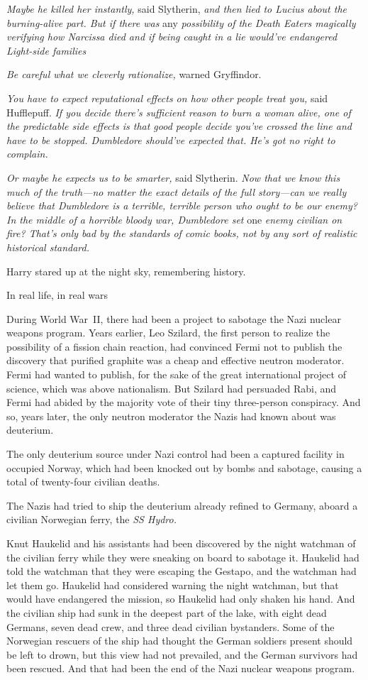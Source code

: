 \emph{Maybe he killed her instantly,} said Slytherin, \emph{and then lied to
Lucius about the burning-alive part. But{\el} if there was} any
\emph{possibility of the Death Eaters magically verifying how Narcissa
died{\el} and if being caught in a lie would've endangered Light-side
families{\el}}

\emph{Be careful what we cleverly rationalize,} warned Gryffindor.

\emph{You have to expect reputational effects on how other people treat you,}
said Hufflepuff. \emph{If you decide there's sufficient reason to burn a woman
alive, one of the predictable side effects is that good people decide you've
crossed the line and have to be stopped. Dumbledore should've expected that.
He's got no right to complain.}

\emph{Or maybe he expects us to be smarter,} said Slytherin. \emph{Now that we
know this much of the truth—no matter the exact details of the full
story—can we really believe that Dumbledore is a terrible, terrible person
who ought to be our enemy? In the middle of a horrible bloody war, Dumbledore
set} one \emph{enemy civilian on fire? That's only bad by the standards of
comic books, not by any sort of realistic historical standard.}

Harry stared up at the night sky, remembering history.

In real life, in real wars{\el}

During World War~II, there had been a project to sabotage the Nazi nuclear
weapons program. Years earlier, Leo Szilard, the first person to realize the
possibility of a fission chain reaction, had convinced Fermi not to publish the
discovery that purified graphite was a cheap and effective neutron moderator.
Fermi had wanted to publish, for the sake of the great international project of
science, which was above nationalism. But Szilard had persuaded Rabi, and Fermi
had abided by the majority vote of their tiny three-person conspiracy. And so,
years later, the only neutron moderator the Nazis had known about was deuterium.

The only deuterium source under Nazi control had been a captured facility in
occupied Norway, which had been knocked out by bombs and sabotage, causing a
total of twenty-four civilian deaths.

The Nazis had tried to ship the deuterium already refined to Germany, aboard a
civilian Norwegian ferry, the \emph{SS Hydro.}

Knut Haukelid and his assistants had been discovered by the night watchman of
the civilian ferry while they were sneaking on board to sabotage it. Haukelid
had told the watchman that they were escaping the Gestapo, and the watchman had
let them go. Haukelid had considered warning the night watchman, but that would
have endangered the mission, so Haukelid had only shaken his hand. And the
civilian ship had sunk in the deepest part of the lake, with eight dead
Germans, seven dead crew, and three dead civilian bystanders. Some of the
Norwegian rescuers of the ship had thought the German soldiers present should
be left to drown, but this view had not prevailed, and the German survivors had
been rescued. And that had been the end of the Nazi nuclear weapons program.

